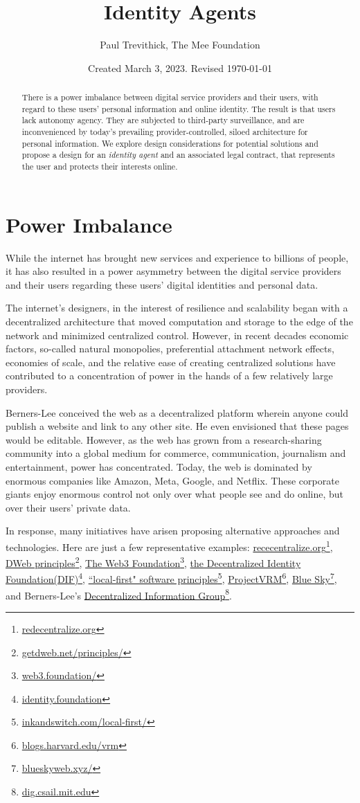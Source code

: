 \documentclass[11pt, oneside]{article}   	%
\title{Identity Agents}
\author{Paul Trevithick, The Mee Foundation}
\date{Created March 3, 2023. Revised \today}
\newcommand{\hyperfootnote}[1][]{\def\ArgI{{#1}}\hyperfootnoteRelay}
\newcommand\hyperfootnoteRelay[2][]{\href{#1#2}{\ArgI}\footnote{\href{#1#2}{#2}}}
\begin{document}
\maketitle
\begin{abstract}
There is a power imbalance between digital service providers and their users, with regard to these users' personal information and online identity. The result is that users lack autonomy agency. They are subjected to third-party surveillance, and are inconvenienced by today's prevailing provider-controlled, siloed architecture for personal information. We explore design considerations for potential solutions and propose a design for an \emph{identity agent} and an associated legal contract, that represents the user and protects their interests online.
\end{abstract}

\section{Power Imbalance}
While the internet has brought new services and experience to billions of people, it has also resulted in a power asymmetry between the digital service providers and their users regarding these users' digital identities and personal data. 

The internet's designers, in the interest of resilience and scalability began with a decentralized architecture that moved computation and storage to the edge of the network and minimized centralized control. However, in recent decades economic factors, so-called natural monopolies, preferential attachment network effects, economies of scale, and the relative ease of creating centralized solutions have contributed to a concentration of power in the hands of a few relatively large providers. 

Berners-Lee conceived the web as a decentralized platform wherein anyone could publish a website and link to any other site. He even envisioned that these pages would be editable. However, as the web has grown from a research-sharing community into a global medium for commerce, communication, journalism and entertainment, power has concentrated. Today, the web is dominated by enormous companies like Amazon, Meta, Google, and Netflix. These corporate giants enjoy enormous control not only over what people see and do online, but over their users' private data.\cite{Finley2017}

In response, many initiatives have arisen proposing alternative approaches and technologies. Here are just a few representative examples: \hyperfootnote[rececentralize.org][https://]{redecentralize.org}, \hyperfootnote[DWeb principles][https://]{getdweb.net/principles/}, \hyperfootnote[The Web3 Foundation][https://]{web3.foundation/}, \hyperfootnote[the Decentralized Identity Foundation(DIF)][https://]{identity.foundation}, \hyperfootnote[``local-first" software principles][https://]{inkandswitch.com/local-first/}, \hyperfootnote[ProjectVRM][https://]{blogs.harvard.edu/vrm}, \hyperfootnote[Blue Sky][https://]{blueskyweb.xyz/}, and Berners-Lee's \hyperfootnote[Decentralized Information Group][https://]{dig.csail.mit.edu}. 
\end{document}
